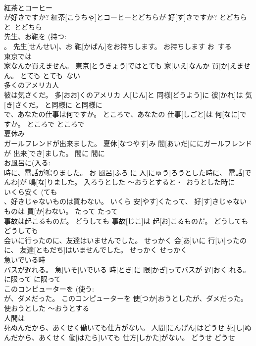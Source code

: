 \documentclass[8pt]{extreport}
\begin{document}
\begin{CJK}{UTF8}{min}
\\	紅茶とコーヒー 
\\	が好きですか?	紅茶[こうちゃ]とコーヒーとどちらが 好[す]きですか?	とどちら	と~とどちら	
\\	先生、お鞄を (持つ: 
\\	。	先生[せんせい]、お 鞄[かばん]をお持ちします。	お持ちします	お~する	
\\	東京では 
\\	家なんか買えません。	東京[とうきょう]ではとても 家[いえ]なんか 買[か]えません。	とても	とても~ない	
\\	多くのアメリカ人 
\\	彼は気さくだ。	多[おお]くのアメリカ 人[じん]と 同様[どうよう]に 彼[かれ]は 気[き]さくだ。	と同様に	と同様に	
\\	で、あなたの仕事は何ですか。	ところで、あなたの 仕事[しごと]は 何[なに]ですか。	ところで	ところで	
\\	夏休み 
\\	ガールフレンドが出来ました。	夏休[なつやす]み 間[あいだ]ににガールフレンドが 出来[でき]ました。	間に	間に	
\\	お風呂に(入る: 
\\	時に、電話が鳴りました。	お 風呂[ふろ]に 入[にゅう]ろうとした時に、 電話[でんわ]が 鳴[な]りました。	入ろうとした	～おうとすると・~おうとした時に	
\\	いくら安く (ても 
\\	、好きじゃないものは買わない。	いくら 安[やす]くたって、 好[す]きじゃないものは 買[か]わない。	たって	たって	
\\	事故は起こるものだ。	どうしても 事故[じこ]は 起[お]こるものだ。	どうしても	どうしても~	
\\	会いに行ったのに、友達はいませんでした。	せっかく 会[あ]いに 行[い]ったのに、 友達[ともだち]はいませんでした。	せっかく	せっかく~	
\\	急いでいる時 
\\	バスが遅れる。	急[いそ]いでいる 時[とき]に 限[かぎ]ってバスが 遅[おく]れる。	に限って	に限って	
\\	このコンピューターを (使う: 
\\	が、ダメだった。	このコンピューターを 使[つか]おうとしたが、ダメだった。	使おうとした	～おうとする	
\\	人間は 
\\	死ぬんだから、あくせく働いても仕方がない。	人間[にんげん]はどうせ 死[し]ぬんだから、あくせく 働[はたら]いても 仕方[しかた]がない。	どうせ	どうせ~	

\end{CJK}
\end{document}
